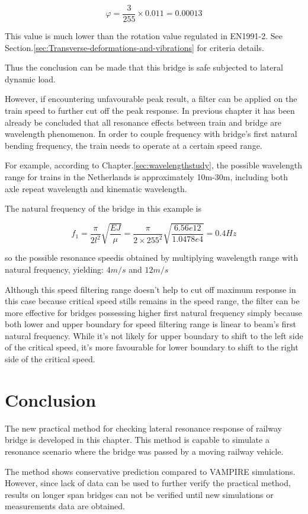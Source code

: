 $$ \varphi = \frac{3}{255}\times 0.011 = 0.00013 $$

This value is much lower than the rotation value regulated in EN1991-2. See Section.\ref{sec:Transverse-deformations-and-vibrations} for criteria details.

Thus the conclusion can be made that this bridge is safe subjected to lateral dynamic load.

However, if encountering unfavourable peak result, a filter can be applied on the train speed to further cut off the peak response. In previous chapter it has been already be concluded that all resonance effects between train and bridge are wavelength phenomenon. In order to couple frequency with bridge's first natural bending frequency, the train needs to operate at a certain speed range. 

For example, according to Chapter.\ref{sec:wavelengthstudy}, the possible wavelength range for trains in the Netherlands is approximately 10m-30m, including both axle repeat wavelength and kinematic wavelength. 

The natural frequency of the bridge in this example is 

$$ f_1 = \frac{\pi}{2l^2}\sqrt{\frac{EJ}{\mu}} = \frac{\pi}{2\times 255^2}\sqrt{\frac{6.56e12}{1.0478e4}} = 0.4Hz$$

so the possible resonance speedis obtained by multiplying wavelength range with natural frequency, yielding: $4m/s$ and $12m/s$

Although this speed filtering range doesn't help to cut off maximum response in this case because critical speed stills remains in the speed range, the filter can be more effective for bridges possessing higher first natural frequency simply because both lower and upper boundary for speed filtering range is linear to beam's first natural frequency. While it's not likely for upper boundary to shift to the left side of the critical speed, it's more favourable for lower boundary to shift to the right side of the critical speed.

\section{Conclusion}

The new practical method for checking lateral resonance response of railway bridge is developed in this chapter. This method is capable to simulate a resonance scenario where the bridge was passed by a moving railway vehicle. 

The method shows conservative prediction compared to VAMPIRE simulations. However, since lack of data can be used to further verify the practical method, results on longer span bridges can not be verified until new simulations or measurements data are obtained.

